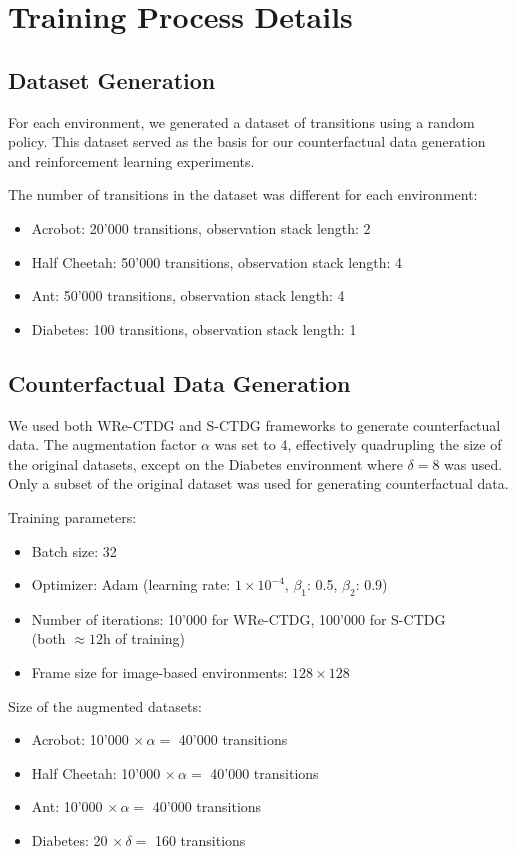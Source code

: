 \section{Training Process Details}

\subsection{Dataset Generation}

For each environment, we generated a dataset of transitions using a random policy.
This dataset served as the basis for our counterfactual
data generation and reinforcement learning experiments.

The number of transitions in the dataset was different for each environment:
\begin{itemize}
    \item Acrobot: 20'000 transitions, observation stack length: 2
    \item Half Cheetah: 50'000 transitions, observation stack length: 4
    \item Ant: 50'000 transitions, observation stack length: 4
    \item Diabetes: 100 transitions, observation stack length: 1
\end{itemize} 

\subsection{Counterfactual Data Generation}

We used both WRe-CTDG and S-CTDG frameworks to generate counterfactual data.
The augmentation factor $\alpha$ was set to 4, effectively quadrupling
the size of the original datasets,
except on the Diabetes environment where $\delta = 8$ was used.
Only a subset of the original dataset
was used for generating counterfactual data.

Training parameters:
\begin{itemize}
    \item Batch size: 32
    \item Optimizer: Adam (learning rate: $1\times 10^{-4}$, $\beta_1$: 0.5, $\beta_2$: 0.9)
    \item Number of iterations: 10'000 for WRe-CTDG, 100'000 for S-CTDG\\
    (both $\approx 12$h of training)
    \item Frame size for image-based environments: $128\times 128$
\end{itemize}
Size of the augmented datasets:
\begin{itemize}
    \item Acrobot: 10'000 $\times \, \alpha =$ 40'000 transitions 
    \item Half Cheetah: 10'000 $\times \, \alpha =$ 40'000 transitions
    \item Ant: 10'000 $\times \, \alpha =$ 40'000 transitions
    \item Diabetes: 20 $\times \, \delta =$ 160 transitions
\end{itemize}



